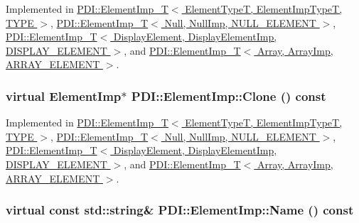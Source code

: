 Implemented in \hyperlink{class_p_d_i_1_1_element_imp___t_e3290d73bffe4f6d3e5c31ed13ec217a}{PDI::ElementImp\_\-T$<$ ElementTypeT, ElementImpTypeT, TYPE $>$}, \hyperlink{class_p_d_i_1_1_element_imp___t_e3290d73bffe4f6d3e5c31ed13ec217a}{PDI::ElementImp\_\-T$<$ Null, NullImp, NULL\_\-ELEMENT $>$}, \hyperlink{class_p_d_i_1_1_element_imp___t_e3290d73bffe4f6d3e5c31ed13ec217a}{PDI::ElementImp\_\-T$<$ DisplayElement, DisplayElementImp, DISPLAY\_\-ELEMENT $>$}, and \hyperlink{class_p_d_i_1_1_element_imp___t_e3290d73bffe4f6d3e5c31ed13ec217a}{PDI::ElementImp\_\-T$<$ Array, ArrayImp, ARRAY\_\-ELEMENT $>$}.\hypertarget{class_p_d_i_1_1_element_imp_fc1ab711c21225f3448c2a7c6a977b25}{
\subsubsection[{Clone}]{\setlength{\rightskip}{0pt plus 5cm}virtual {\bf ElementImp}$\ast$ PDI::ElementImp::Clone () const}}
\label{class_p_d_i_1_1_element_imp_fc1ab711c21225f3448c2a7c6a977b25}




Implemented in \hyperlink{class_p_d_i_1_1_element_imp___t_5b9c768557a43a6a352db1660df50e04}{PDI::ElementImp\_\-T$<$ ElementTypeT, ElementImpTypeT, TYPE $>$}, \hyperlink{class_p_d_i_1_1_element_imp___t_5b9c768557a43a6a352db1660df50e04}{PDI::ElementImp\_\-T$<$ Null, NullImp, NULL\_\-ELEMENT $>$}, \hyperlink{class_p_d_i_1_1_element_imp___t_5b9c768557a43a6a352db1660df50e04}{PDI::ElementImp\_\-T$<$ DisplayElement, DisplayElementImp, DISPLAY\_\-ELEMENT $>$}, and \hyperlink{class_p_d_i_1_1_element_imp___t_5b9c768557a43a6a352db1660df50e04}{PDI::ElementImp\_\-T$<$ Array, ArrayImp, ARRAY\_\-ELEMENT $>$}.\hypertarget{class_p_d_i_1_1_element_imp_da2e8eb39d66e053c0d29318959aa661}{
\subsubsection[{Name}]{\setlength{\rightskip}{0pt plus 5cm}virtual const std::string\& PDI::ElementImp::Name () const}}
\label{class_p_d_i_1_1_element_imp_da2e8eb39d66e053c0d29318959aa661}





